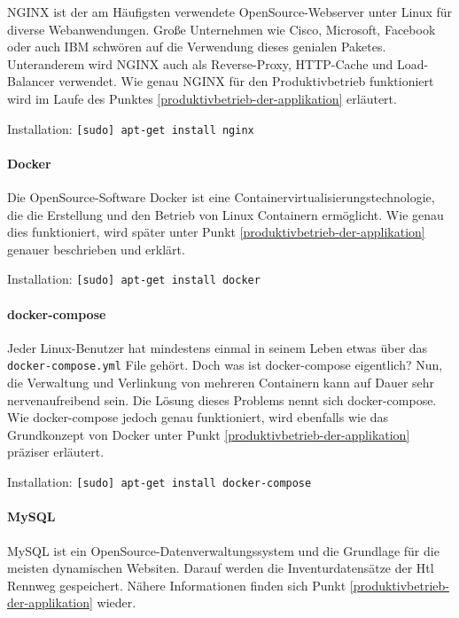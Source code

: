 NGINX ist der am Häufigsten verwendete OpenSource-Webserver unter Linux
für diverse Webanwendungen. Große Unternehmen wie Cisco, Microsoft,
Facebook oder auch IBM schwören auf die Verwendung dieses genialen
Paketes. Unteranderem wird NGINX auch als Reverse-Proxy, HTTP-Cache und
Load-Balancer verwendet. Wie genau NGINX für den Produktivbetrieb
funktioniert wird im Laufe des Punktes \ref{produktivbetrieb-der-applikation} erläutert.

Installation: \texttt{{[}sudo{]}\ apt-get\ install\ nginx}

\hypertarget{docker}{%
\paragraph{Docker}\label{docker}}

Die OpenSource-Software Docker ist eine
Containervirtualisierungstechnologie, die die Erstellung und den Betrieb
von Linux Containern ermöglicht. Wie genau dies funktioniert, wird
später unter Punkt \ref{produktivbetrieb-der-applikation} genauer
beschrieben und erklärt.

Installation: \texttt{{[}sudo{]}\ apt-get\ install\ docker}

\hypertarget{docker-compose}{%
\paragraph{docker-compose}\label{docker-compose}}

Jeder Linux-Benutzer hat mindestens einmal in seinem Leben etwas über
das \texttt{docker-compose.yml} File gehört. Doch was ist docker-compose
eigentlich? Nun, die Verwaltung und Verlinkung von mehreren Containern
kann auf Dauer sehr nervenaufreibend sein. Die Lösung dieses Problems
nennt sich docker-compose. Wie docker-compose jedoch genau funktioniert,
wird ebenfalls wie das Grundkonzept von Docker unter Punkt
\ref{produktivbetrieb-der-applikation} präziser erläutert.

Installation: \texttt{{[}sudo{]}\ apt-get\ install\ docker-compose}

\hypertarget{mysql}{%
\paragraph{MySQL}\label{mysql}}

MySQL ist ein OpenSource-Datenverwaltungssystem und die Grundlage für
die meisten dynamischen Websiten. Darauf werden die Inventurdatensätze
der Htl Rennweg gespeichert. Nähere Informationen finden sich Punkt
\ref{produktivbetrieb-der-applikation} wieder.


